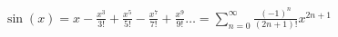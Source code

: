 \documentclass[preview]{standalone}
\begin{document}
\begin{align*}
\sin(x)= x -\frac{x^3}{3 !} +\frac{x^5}{5 !} -\frac{x^7}{7 !} +\frac{x^9}{9 !} \ldots = \sum_{n=0}^{\infty} \frac{(-1)^n}{(2 n+1) !} x^{2 n+1}
\end{align*}
\end{document}
